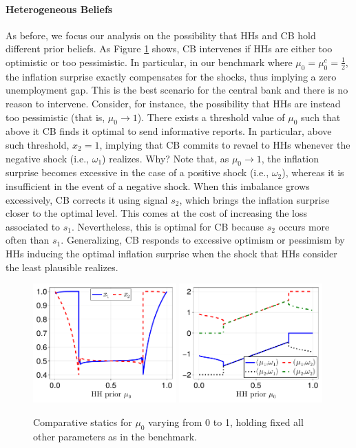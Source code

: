 \documentclass[12pt,a4paper]{article}
\begin{document}
\paragraph{Heterogeneous Beliefs}
As before, we focus our analysis on the possibility that HHs and CB hold different prior beliefs. As Figure \ref{Figure3} shows, CB intervenes if HHs are either too optimistic or too pessimistic. In particular, in our benchmark where $\mu_0=\mu_0^c=\frac{1}{2}$, the inflation surprise exactly compensates for the shocks, thus implying a zero unemployment gap. This is the best scenario for the central bank and there is no reason to intervene. Consider, for instance, the possibility that HHs are instead too pessimistic (that is, $\mu_0\to 1$). There exists a threshold value of $\mu_0$ such that above it CB finds it optimal to send informative reports. In particular, above such threshold, $x_2=1$, implying that CB commits to revael to HHs whenever the negative shock (i.e., $\omega_1$) realizes. Why? Note that, as $\mu_0\to 1$, the inflation surprise becomes excessive in the case of a positive shock (i.e., $\omega_2$), whereas it is insufficient in the event of a negative shock. When this imbalance grows excessively, CB corrects it using signal $s_2$, which brings the inflation surprise closer to the optimal level. This comes at the cost of increasing the loss associated to $s_1$. Nevertheless, this is optimal for CB because $s_2$ occurs more often than $s_1$. Generalizing, CB responds to excessive optimism or pessimism by HHs inducing the optimal inflation surprise when the shock that HHs consider the least plausible realizes.

\begin{figure}[H]
\centering
\includegraphics[width=0.49\textwidth]{figures/V11/γ=1.0-μ_0=0.5-α=1.0-θ=1.0/communication/fig_optimal_x_by_μ_0.pdf}
\includegraphics[width=0.49\textwidth]{figures/V11/γ=1.0-μ_0=0.5-α=1.0-θ=1.0/communication/fig_optimal_γ_by_μ_0.pdf}
\caption{Comparative statics for $\mu_0$ varying from 0 to 1, holding fixed all other parameters as in the benchmark.}
\label{Figure3}
\end{figure}
\end{document}
